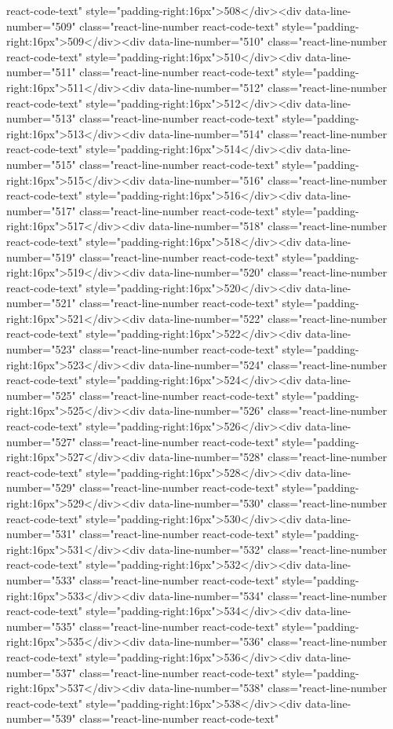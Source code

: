 {{{{{{{react-code-text" style="padding-right:16px">508</div><div data-line-number="509" class="react-line-number react-code-text" style="padding-right:16px">509</div><div data-line-number="510" class="react-line-number react-code-text" style="padding-right:16px">510</div><div data-line-number="511" class="react-line-number react-code-text" style="padding-right:16px">511</div><div data-line-number="512" class="react-line-number react-code-text" style="padding-right:16px">512</div><div data-line-number="513" class="react-line-number react-code-text" style="padding-right:16px">513</div><div data-line-number="514" class="react-line-number react-code-text" style="padding-right:16px">514</div><div data-line-number="515" class="react-line-number react-code-text" style="padding-right:16px">515</div><div data-line-number="516" class="react-line-number react-code-text" style="padding-right:16px">516</div><div data-line-number="517" class="react-line-number react-code-text" style="padding-right:16px">517</div><div data-line-number="518" class="react-line-number react-code-text" style="padding-right:16px">518</div><div data-line-number="519" class="react-line-number react-code-text" style="padding-right:16px">519</div><div data-line-number="520" class="react-line-number react-code-text" style="padding-right:16px">520</div><div data-line-number="521" class="react-line-number react-code-text" style="padding-right:16px">521</div><div data-line-number="522" class="react-line-number react-code-text" style="padding-right:16px">522</div><div data-line-number="523" class="react-line-number react-code-text" style="padding-right:16px">523</div><div data-line-number="524" class="react-line-number react-code-text" style="padding-right:16px">524</div><div data-line-number="525" class="react-line-number react-code-text" style="padding-right:16px">525</div><div data-line-number="526" class="react-line-number react-code-text" style="padding-right:16px">526</div><div data-line-number="527" class="react-line-number react-code-text" style="padding-right:16px">527</div><div data-line-number="528" class="react-line-number react-code-text" style="padding-right:16px">528</div><div data-line-number="529" class="react-line-number react-code-text" style="padding-right:16px">529</div><div data-line-number="530" class="react-line-number react-code-text" style="padding-right:16px">530</div><div data-line-number="531" class="react-line-number react-code-text" style="padding-right:16px">531</div><div data-line-number="532" class="react-line-number react-code-text" style="padding-right:16px">532</div><div data-line-number="533" class="react-line-number react-code-text" style="padding-right:16px">533</div><div data-line-number="534" class="react-line-number react-code-text" style="padding-right:16px">534</div><div data-line-number="535" class="react-line-number react-code-text" style="padding-right:16px">535</div><div data-line-number="536" class="react-line-number react-code-text" style="padding-right:16px">536</div><div data-line-number="537" class="react-line-number react-code-text" style="padding-right:16px">537</div><div data-line-number="538" class="react-line-number react-code-text" style="padding-right:16px">538</div><div data-line-number="539" class="react-line-number react-code-text" }}}}}}}
